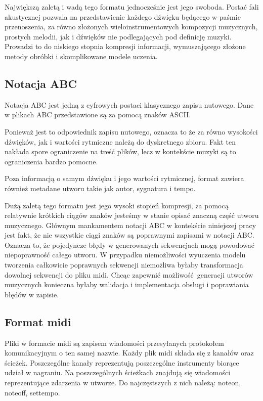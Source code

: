 {{{            Największą zaletą i wadą tego formatu jednocześnie jest jego swoboda. 
            Postać fali akustycznej pozwala na przedstawienie każdego dźwięku będącego w paśmie
            przenoszenia, za równo złożonych wieloinstrumentowych kompozycji muzycznych, 
            prostych melodii, jak i dźwięków nie podlegających pod definicję muzyki. 
            Prowadzi to do niskiego stopnia kompresji informacji, wymuszającego złożone metody obróbki i skomplikowane
            modele uczenia.
        }

        \subsection{Notacja ABC}
        {
            Notacja ABC jest jedną z cyfrowych postaci klasycznego zapisu nutowego.
            Dane w plikach ABC przedstawione są za pomocą znaków ASCII.

            Ponieważ jest to odpowiednik zapisu nutowego, oznacza to
            że za równo wysokości dźwięków, jak i wartości rytmiczne należą do dyskretnego zbioru.
            Fakt ten nakłada spore ograniczenie na treść plików, lecz w kontekście muzyki są to 
            ograniczenia bardzo pomocne.

            Poza informacją o samym dźwięku i jego wartości rytmicznej, format zawiera również metadane
            utworu takie jak autor, sygnatura i tempo.


            Dużą zaletą tego formatu jest jego wysoki stopień kompresji, za pomocą relatywnie krótkich ciągów
            znaków jesteśmy w stanie opisać znaczną część utworu muzycznego. Głównym mankamentem notacji ABC
            w kontekście niniejszej pracy jest fakt, że nie wszystkie ciągi znaków są poprawnymi zapisami 
            w notacji ABC. Oznacza to, że pojedyncze błędy w generowanych sekwencjach mogą powodować niepoprawność całego utworu.
            W przypadku niemożliwości wyuczenia modelu tworzenia całkowicie poprawnych sekwencji niemożliwa byłaby
            transformacja dowolnej sekwencji do pliku midi. Chcąc zapewnić możliwość generacji utworów muzycznych
            konieczna byłaby walidacja i implementacja obsługi i poprawiania błędów w zapisie.
        }

        \subsection{Format midi}
        {
            Pliki w formacie midi są zapisem wiadomości przesyłanych protokołem komunikacyjnym o ten samej nazwie.
            Każdy plik midi składa się z kanałów oraz ścieżek. Poszczególne kanały reprezentują poszczególne instrumenty
            biorące udział w nagraniu. Na poszczególnych ścieżkach znajdują się wiadomości reprezentujące zdarzenia w utworze.
            Do najczęstszych z nich należą: note\textunderscore on, note\textunderscore off, set\textunderscore tempo.

}}}
